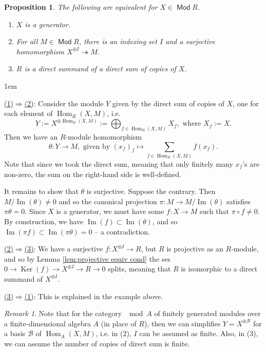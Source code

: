 \documentclass[11pt,a4paper]{article}
\makeatletter
\numberwithin{equation}{section}
\renewenvironment{proof}[1][\proofname]{\par
    \pushQED{\qed}%
    \normalfont \topsep0\p@\@plus6\p@ \labelsep1em\relax
    \trivlist
    \item[\hskip\labelsep\indent
        \bfseries #1]\ignorespaces
    \mbox{}
}{
    \popQED\endtrivlist\@endpefalse
}
\theoremstyle{all}
\newtheorem{proposition}[theorem]{Proposition}
\theoremstyle{remark}
\newtheorem{remark}[theorem]{Remark}
\DeclareMathOperator{\onto}{\twoheadrightarrow}
\newcommand{\Hom}{\operatorname{Hom}\nolimits}
\renewcommand{\Im}{\operatorname{Im}\nolimits}
\newcommand{\Ker}{\operatorname{Ker}\nolimits}
\DeclareMathOperator{\Mod}{\mathsf{Mod}}
\makeatother
\begin{document}
\begin{proposition}\label{prop:generator}
The following are equivalent for $X\in \Mod R$.
\begin{enumerate}
\item $X$ is a generator.
\item For all $M\in \Mod R$, there is an indexing set $I$ and a surjective homomorphism $X^{\oplus I} \onto M$.
\item $R$ is a direct summand of a direct sum of copies of $X$.
\end{enumerate}
\end{proposition}
\begin{proof}
\underline{(1)$\Rightarrow$(2)}:  Consider the module $Y$ given by the direct sum of copies of $X$, one for each element of $\Hom_R(X,M)$, i.e.
\[
Y:=X^{\oplus\Hom_R(X,M)}:=\bigoplus_{f\in \Hom_R(X,M)} X_f, \text{ where } X_f:=X.
\]
Then we have an $R$-module homomorphism 
\[
\theta: Y\to M, \text{ given by } (x_f)_f \mapsto \sum_{f\in \Hom_R(X,M)} f(x_f).
\]
Note that since we took the direct sum, meaning that only finitely many $x_f$'s are non-zero, the sum on the right-hand side is well-defined.  

It remains to show that $\theta$ is surjective.  Suppose the contrary.  Then $M/\Im(\theta)\neq 0$ and so the canonical projection $\pi:M\to M/\Im(\theta)$ satisfies $\pi\theta =0$.  Since $X$ is a generator, we must have some $f:X\to M$ such that $\pi \circ f \neq 0$.  By construction, we have $\Im(f)\subset \Im(\theta)$, and so $\Im(\pi f)\subset \Im(\pi\theta)=0$ -- a contradiction.

\underline{(2)$\Rightarrow$(3)}: We have a surjective $f:X^{\oplus I}\to R$, but $R$ is projective as an $R$-module, and so by Lemma \ref{lem:projective equiv cond} the ses $0\to \Ker(f)\to X^{\oplus I} \to R\to 0$ splits, meaning that $R$ is isomorphic to a direct summand of $X^{\oplus I}$.

\underline{(3)$\Rightarrow$(1)}:  This is explained in the example above.
\end{proof}
\begin{remark}\label{rem:generator}
Note that for the category $\mod A$ of finitely generated modules over a finite-dimensional algebra $A$ (in place of $R$), then we can simplifies $Y=X^{\oplus \mathcal{B}}$ for a basis $\mathcal{B}$ of $\Hom_A(X,M)$, i.e. in (2), $I$ can be assumed as finite.  Also, in (3), we can assume the number of copies of direct sum is finite.
\end{remark}
\end{document}
